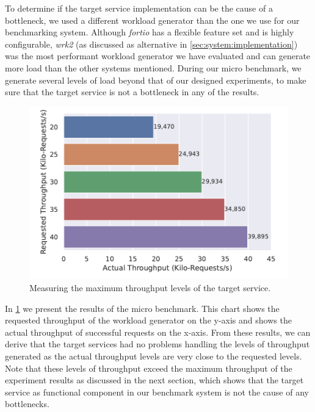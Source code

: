 To determine if the target service implementation can be the cause of a bottleneck, we used a different workload generator than the one we use for our benchmarking system. Although \textit{fortio} has a flexible feature set and is highly configurable, \textit{wrk2} (as discussed as alternative in \cref{sec:system:implementation}) was the most performant workload generator we have evaluated and can generate more load than the other systems mentioned. During our micro benchmark, we generate several levels of load beyond that of our designed experiments, to make sure that the target service is not a bottleneck in any of the results.

\begin{figure}[!t]
    \centering
    
    \includegraphics[width=0.8\linewidth]{5_experimental_evaluation/figures/microbench-target-service.pdf}

    \caption[Micro benchmark - Measuring the maximum throughput levels of the target service]{Measuring the maximum throughput levels of the target service.}
    
    \label{fig:microbench:target-svc}
\end{figure}

In \cref{fig:microbench:target-svc} we present the results of the micro benchmark. This chart shows the requested throughput of the workload generator on the y-axis and shows the actual throughput of successful requests on the x-axis. From these results, we can derive that the target services had no problems handling the levels of throughput generated as the actual throughput levels are very close to the requested levels. Note that these levels of throughput exceed the maximum throughput of the experiment results as discussed in the next section, which shows that the target service as functional component in our benchmark system is not the cause of any bottlenecks.
